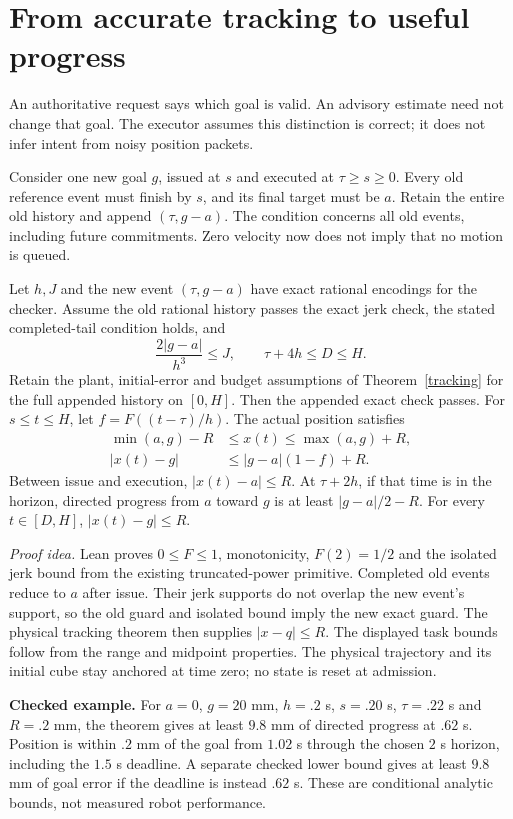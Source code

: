 \section{From accurate tracking to useful progress}\label{taskcontract}
An authoritative request says which goal is valid. An advisory estimate need not
change that goal. The executor assumes this distinction is correct; it does not
infer intent from noisy position packets.

Consider one new goal $g$, issued at $s$ and executed at $\tau\geq s\geq0$.
Every old reference event must finish by $s$, and its final target must be $a$.
Retain the entire old history and append $(\tau,g-a)$. The condition concerns
all old events, including future commitments. Zero velocity now does not imply
that no motion is queued.

\begin{theorem}
Let $h,J$ and the new event $(\tau,g-a)$ have exact rational encodings for the
checker. Assume the old rational history passes the exact jerk check, the stated
completed-tail condition holds, and
\[
\frac{2|g-a|}{h^3}\leq J,\qquad \tau+4h\leq D\leq H.
\]
Retain the plant, initial-error and budget assumptions of Theorem~\ref{tracking}
for the full appended history on $[0,H]$. Then the appended exact check passes.
For $s\leq t\leq H$, let $f=F((t-\tau)/h)$. The actual position satisfies
\begin{align*}
\min(a,g)-R&\leq x(t)\leq\max(a,g)+R,\\
|x(t)-g|&\leq |g-a|(1-f)+R.
\end{align*}
Between issue and execution, $|x(t)-a|\leq R$. At $\tau+2h$, if that time is in
the horizon, directed progress from $a$ toward $g$ is at least $|g-a|/2-R$.
For every $t\in[D,H]$, $|x(t)-g|\leq R$.
\end{theorem}

\textit{Proof idea.} Lean proves $0\leq F\leq1$, monotonicity, $F(2)=1/2$ and
the isolated jerk bound from the existing truncated-power primitive. Completed
old events reduce to $a$ after issue. Their jerk supports do not overlap the new
event's support, so the old guard and isolated bound imply the new exact guard.
The physical tracking theorem then supplies $|x-q|\leq R$. The displayed task
bounds follow from the range and midpoint properties. The physical trajectory
and its initial cube stay anchored at time zero; no state is reset at admission.

\textbf{Checked example.} For $a=0$, $g=20$ mm, $h=.2$ s, $s=.20$ s,
$\tau=.22$ s and $R=.2$ mm, the theorem gives at least $9.8$ mm of directed
progress at $.62$ s. Position is within $.2$ mm of the goal from $1.02$ s through
the chosen $2$ s horizon, including the $1.5$ s deadline. A separate checked
lower bound gives at least $9.8$ mm of goal error if the deadline is instead
$.62$ s. These are conditional analytic bounds, not measured robot performance.

